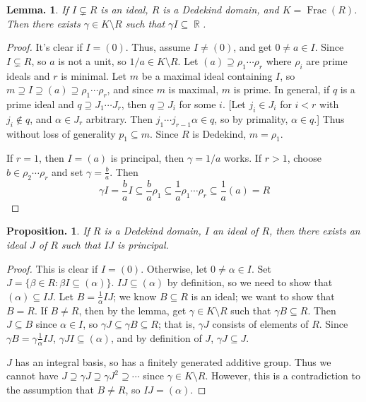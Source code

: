 \documentclass[11pt, a4paper]{memoir}
\DeclareMathOperator{\R}{{\mathbb{R}}}
\theoremstyle{change}
\newtheorem{lemma}[theorem]{Lemma.}
\newtheorem{proposition}[theorem]{Proposition.}
\theoremstyle{plain}
\theoremstyle{nonumberplain}
\newtheorem{proof}{Proof}
\DeclareMathOperator{\Frac}{Frac}
\begin{document}
\begin{lemma}
    If $I\subsetneq R$ is an ideal, $R$ is a Dedekind domain, and $K=\Frac(R)$.
    Then there exists $\gamma\in K\setminus R$ such that $\gamma I\subseteq\R$.
\end{lemma}
\begin{proof}
    It's clear if $I=(0)$.
    Thus, assume $I\neq (0)$, and get $0\neq a\in I$.
    Since $I\subsetneq R$, so $a$ is not a unit, so $1/a\in K\setminus R$.
    Let $(a)\supseteq\rho_1\cdots\rho_r$ where $\rho_i$ are prime ideals and $r$ is minimal.
    Let $m$ be a maximal ideal containing $I$, so $m\supseteq I\supseteq(a)\supseteq\rho_1\cdots\rho_r$, and since $m$ is maximal, $m$ is prime.
    In general, if $q$ is a prime ideal and $q\supseteq J_1\cdots J_r$, then $q\supseteq J_i$ for some $i$.
    [Let $j_i\in J_i$ for $i<r$ with $j_i\notin q$, and $\alpha\in J_r$ arbitrary.
    Then $j_1\cdots j_{r-1}\alpha\in q$, so by primality, $\alpha\in q$.]
    Thus without loss of generality $p_1\subseteq m$.
    Since $R$ is Dedekind, $m=\rho_1$.

    If $r=1$, then $I=(a)$ is principal, then $\gamma=1/a$ works.
    If $r>1$, choose $b\in\rho_2\cdots\rho_r$ and set $\gamma=\frac{b}{a}$.
    Then
    \begin{equation*}
        \gamma I=\frac{b}{a}I\subseteq\frac{b}{a}\rho_1\subseteq\frac{1}{a}\rho_1\cdots\rho_r\subseteq\frac{1}{a}(a)=R
    \end{equation*}
\end{proof}
\begin{proposition}
    If $R$ is a Dedekind domain, $I$ an ideal of $R$, then there exists an ideal $J$ of $R$ such that $IJ$ is principal.
\end{proposition}
\begin{proof}
    This is clear if $I=(0)$.
    Otherwise, let $0\neq\alpha\in I$.
    Set $J=\{\beta\in R:\beta I\subseteq(\alpha)\}$.
    $IJ\subseteq(\alpha)$ by definition, so we need to show that $(\alpha)\subseteq IJ$.
    Let $B=\frac{1}{\alpha}IJ$; we know $B\subseteq R$ is an ideal; we want to show that $B=R$.
    If $B\neq R$, then by the lemma, get $\gamma\in K\setminus R$ such that $\gamma B\subseteq R$.
    Then $J\subseteq B$ since $\alpha\in I$, so $\gamma J\subseteq\gamma B\subseteq R$; that is, $\gamma J$ consists of elements of $R$.
    Since $\gamma B=\gamma\frac{1}{\alpha} IJ$, $\gamma JI\subseteq(\alpha)$, and by definition of $J$, $\gamma J\subseteq J$.

    $J$ has an integral basis, so has a finitely generated additive group.
    Thus we cannot have $J\supseteq\gamma J\supseteq\gamma J^2\supseteq\cdots$ since $\gamma\in K\setminus R$.
    However, this is a contradiction to the assumption that $B\neq R$, so $IJ=(\alpha)$.
\end{proof}
\end{document}
